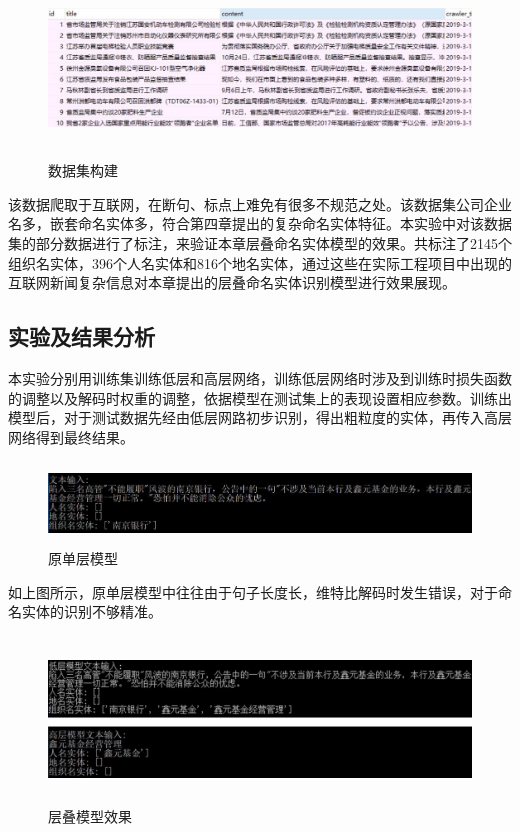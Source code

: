 \documentclass[winfonts,master,oneside,nobackinfo]{njuthesis}
\begin{document}
\begin{figure}[H]
\centering
\begin{minipage}[t]{\textwidth}
\includegraphics[width=1\textwidth,height=4.7cm]{./figure/数据集.jpg}
\caption{数据集构建}
\label{lab:1}
\end{minipage}
\end{figure}
该数据爬取于互联网，在断句、标点上难免有很多不规范之处。该数据集公司企业名多，嵌套命名实体多，符合第四章提出的复杂命名实体特征。本实验中对该数据集的部分数据进行了标注，来验证本章层叠命名实体模型的效果。共标注了2145个组织名实体，396个人名实体和816个地名实体，通过这些在实际工程项目中出现的互联网新闻复杂信息对本章提出的层叠命名实体识别模型进行效果展现。

\subsection{实验及结果分析}

本实验分别用训练集训练低层和高层网络，训练低层网络时涉及到训练时损失函数的调整以及解码时权重的调整，依据模型在测试集上的表现设置相应参数。训练出模型后，对于测试数据先经由低层网路初步识别，得出粗粒度的实体，再传入高层网络得到最终结果。

\begin{figure}[H]
\centering
\begin{minipage}[t]{\textwidth}
\includegraphics[width=1\textwidth,height=2.2cm]{./figure/原单层模型.jpg}
\caption{原单层模型}
\label{lab:1}
\end{minipage}
\end{figure}

如上图所示，原单层模型中往往由于句子长度长，维特比解码时发生错误，对于命名实体的识别不够精准。

\begin{figure}[H]
\centering
\begin{minipage}[t]{\textwidth}
\includegraphics[width=1\textwidth,height=4.4cm]{./figure/层叠模型效果.jpg}
\caption{层叠模型效果}
\label{lab:1}
\end{minipage}
\end{figure}
\end{document}
